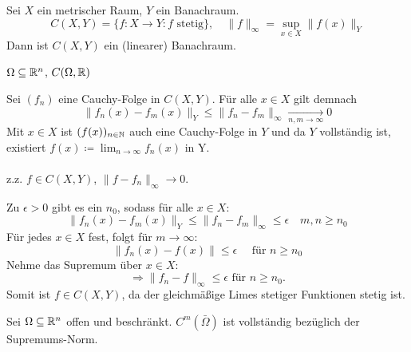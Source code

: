 \begin{prop}
	Sei $X$ ein metrischer Raum, $Y$ ein Banachraum.
	\[ C(X, Y) = \{ f \colon X \rightarrow Y: f \text{ stetig} \}, \quad \| f \|_{\infty} = \sup_{x \in X} \| f(x) \|_{Y} \]
	Dann ist $C(X, Y)$ ein (linearer) Banachraum.
\end{prop}


\begin{beispiel*}
	$\Omega \subseteq \mathbb{R}^{n}$, $C(\Omega, \mathbb{R})$
\end{beispiel*}

\begin{beweis}
	Sei $(f_{n})$ eine Cauchy-Folge in $C(X, Y)$. Für alle $x \in X$ gilt demnach
	\[ \| f_{n}(x) - f_{m}(x) \|_{Y} \leq \| f_{n} - f_{m} \|_{\infty} \xrightarrow[n, m \rightarrow \infty]{} 0 \]
	Mit $x \in X$ ist $(f(x))_{n \in \mathbb{N}}$ auch eine Cauchy-Folge in $Y$ und da $Y$ vollständig ist, existiert $f(x) \coloneqq \lim_{n \rightarrow \infty} f_{n}(x)$ in Y. \\ \\
	z.z. $f \in C(X, Y)$, $\| f - f_{n} \|_{\infty} \rightarrow 0$.
	
	Zu $\epsilon > 0$ gibt es ein $n_{0}$, sodass für alle $x \in X$:
		\[ \| f_{n}(x) - f_{m}(x) \|_{Y} \leq \| f_{n} - f_{m} \|_{\infty} \leq \epsilon \quad m, n \geq n_{0} \]
	Für jedes $x \in X$ fest, folgt für $m \rightarrow \infty$:
		\[ \| f_{n}(x) - f(x) \| \leq \epsilon \quad \text{ für } n \geq n_{0} \]
	Nehme das Supremum über $x \in X$:
		\[ \Rightarrow \| f_{n} - f \|_{\infty} \leq \epsilon \text{ für } n \geq n_{0}. 	\]
	Somit ist $f \in C(X, Y)$, da der gleichmä{\ss}ige Limes stetiger Funktionen stetig ist.
\end{beweis}


\begin{beispiel}
	Sei $\Omega \subseteq \mathbb{R}^{n}$ offen und beschränkt. $C^{m}(\bar \Omega)$ ist vollständig bezüglich der Supremums-Norm.	
\end{beispiel}


